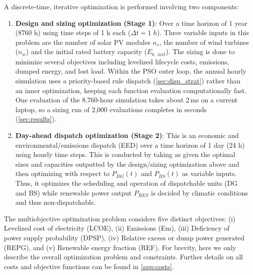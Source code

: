 \documentclass[final,3p,times]{elsarticle}
\begin{document}
A discrete-time, iterative optimization is performed involving two components:

\begin{enumerate}
    \item \textbf{Design and sizing optimization (Stage 1)}: Over a time horizon of 1 year (8760 h) using time steps of 1 h each ($\Delta t = 1\;h$). Three variable inputs in this problem are the number of solar PV modules $n_s$, the number of wind turbines ($n_w$) and the initial rated battery capacity ($E_{b,\;init}$). The sizing is done to minimize several objectives including levelized lifecycle costs, emissions, dumped energy, and lost load. Within the PSO outer loop, the annual hourly simulation uses a priority-based rule dispatch (\cref{sec:disp_strat}) rather than an inner optimization, keeping each function evaluation computationally fast. One evaluation of the 8,760-hour simulation takes about 2\,ms on a current laptop, so a sizing run of 2,000 evaluations completes in seconds (\cref{sec:results}).
    \item \textbf{Day-ahead dispatch optimization (Stage 2)}: This is an economic and environmental/emissions dispatch (EED) over a time horizon of 1 day (24 h) using hourly time steps. This is conducted by taking as given the optimal sizes and capacities outputted by the design/sizing optimization above and then optimizing with respect to $P_{DG}(t)$ and $P_{BS}(t)$ as variable inputs. Thus, it optimizes the scheduling and operation of dispatchable units (DG and BS) while renewable power output $P_{RES}$ is decided by climatic conditions and thus non-dispatchable.
\end{enumerate}

The multiobjective optimization problem considers five distinct objectives: (i) Levelized cost of electricity (LCOE), (ii) Emissions (Em), (iii) Deficiency of power supply probability (DPSP), (iv) Relative excess or dump power generated (REPG), and (v) Renewable energy fraction (REF). For brevity, here we only describe the overall optimization problem and constraints. Further details on all costs and objective functions can be found in \cref{app:costs}. 
\end{document}
